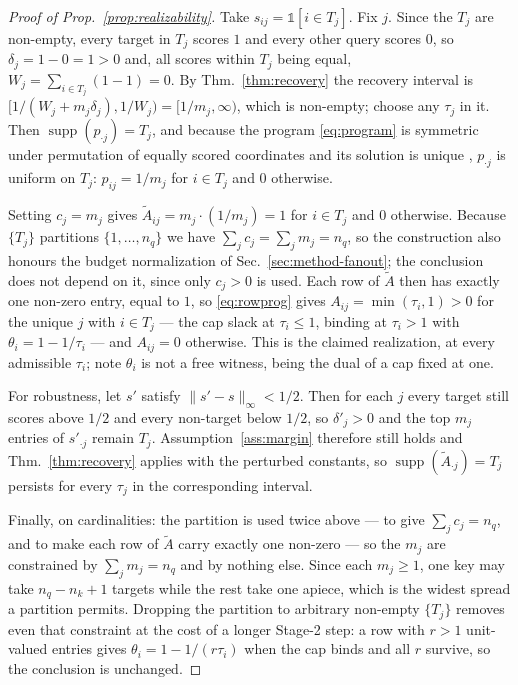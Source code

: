 \documentclass{article}
\newcommand{\supp}{\operatorname{supp}}
\begin{document}
\begin{proof}[Proof of Prop.~\ref{prop:realizability}]
Take $s_{ij} = \mathbb{1}[i \in T_j]$. Fix $j$. Since the $T_j$ are non-empty, every target in
$T_j$ scores $1$ and every other query scores $0$, so
$\delta_j = 1 - 0 = 1 > 0$ and, all scores within $T_j$ being equal,
$W_j = \sum_{i \in T_j}(1 - 1) = 0$. By Thm.~\ref{thm:recovery} the recovery interval is
$[1/(W_j+m_j \delta_j), 1/W_j) = [1/m_j, \infty)$, which is non-empty; choose any $\tau_j$ in it.
Then $\supp(p_{\cdot j}) = T_j$, and because the program \eqref{eq:program} is symmetric under
permutation of equally scored coordinates and its solution is unique
\citep{martins2016softmax}, $p_{\cdot j}$ is uniform on $T_j$: $p_{ij} = 1/m_j$ for
$i \in T_j$ and $0$ otherwise.

Setting $c_j = m_j$ gives $\tilde A_{ij} = m_j \cdot (1/m_j) = 1$ for $i \in T_j$ and $0$
otherwise. Because $\{T_j\}$ partitions $\{1,\dots,n_q\}$ we have
$\sum_j c_j = \sum_j m_j = n_q$, so the construction also honours the budget normalization of
Sec.~\ref{sec:method-fanout}; the conclusion does not depend on it, since only $c_j>0$ is used.
Each row of $\tilde A$ then has exactly one non-zero entry, equal to $1$, so \eqref{eq:rowprog}
gives $A_{ij} = \min(\tau_i,1) > 0$ for the unique $j$ with $i \in T_j$ --- the cap slack at
$\tau_i\le1$, binding at $\tau_i>1$ with $\theta_i = 1-1/\tau_i$ --- and $A_{ij} = 0$ otherwise.
This is the claimed realization, at every admissible $\tau_i$; note $\theta_i$ is not a free
witness, being the dual of a cap fixed at one.

For robustness, let $s'$ satisfy $\|s' - s\|_\infty < 1/2$. Then for each $j$ every target
still scores above $1/2$ and every non-target below $1/2$, so $\delta'_j > 0$ and the top $m_j$
entries of $s'_{\cdot j}$ remain $T_j$. Assumption~\ref{ass:margin} therefore still holds and
Thm.~\ref{thm:recovery} applies with the perturbed constants, so
$\supp(\tilde A_{\cdot j}) = T_j$ persists for every $\tau_j$ in the corresponding interval.

Finally, on cardinalities: the partition is used twice above --- to give $\sum_j c_j=n_q$, and to
make each row of $\tilde A$ carry exactly one non-zero --- so the $m_j$ are constrained by
$\sum_j m_j = n_q$ and by nothing else. Since each $m_j \ge 1$, one key may take
$n_q-n_k+1$ targets while the rest take one apiece, which is the widest spread a partition
permits. Dropping the partition to arbitrary non-empty $\{T_j\}$ removes even that constraint at
the cost of a longer Stage-2 step: a row with $r>1$ unit-valued entries gives
$\theta_i = 1 - 1/(r\tau_i)$ when the cap binds and all $r$ survive, so the conclusion is
unchanged.
\end{proof}
\end{document}
